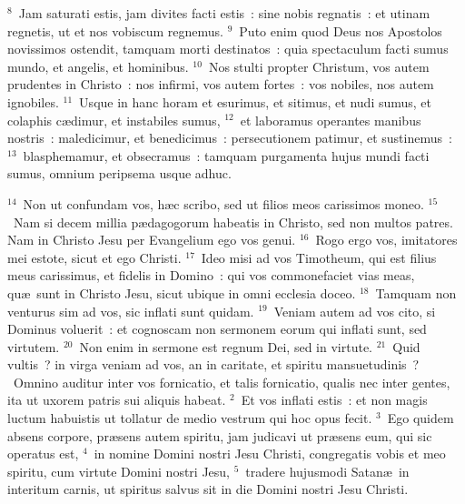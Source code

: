 ${}^{8}$~Jam saturati estis, jam divites facti estis~: sine nobis regnatis~: et utinam regnetis, ut et nos vobiscum regnemus.
${}^{9}$~Puto enim quod Deus nos Apostolos novissimos ostendit, tamquam morti destinatos~: quia spectaculum facti sumus mundo, et angelis, et hominibus.
${}^{10}$~Nos stulti propter Christum, vos autem prudentes in Christo~: nos infirmi, vos autem fortes~: vos nobiles, nos autem ignobiles.
${}^{11}$~Usque in hanc horam et esurimus, et sitimus, et nudi sumus, et colaphis c\ae dimur, et instabiles sumus,
${}^{12}$~et laboramus operantes manibus nostris~: maledicimur, et benedicimus~: persecutionem patimur, et sustinemus~:
${}^{13}$~blasphemamur, et obsecramus~: tamquam purgamenta hujus mundi facti sumus, omnium peripsema usque adhuc.


${}^{14}$~Non ut confundam vos, h\ae c scribo, sed ut filios meos carissimos moneo.
${}^{15}$~Nam si decem millia p\ae dagogorum habeatis in Christo, sed non multos patres. Nam in Christo Jesu per Evangelium ego vos genui.
${}^{16}$~Rogo ergo vos, imitatores mei estote, sicut et ego Christi.
${}^{17}$~Ideo misi ad vos Timotheum, qui est filius meus carissimus, et fidelis in Domino~: qui vos commonefaciet vias meas, qu\ae\ sunt in Christo Jesu, sicut ubique in omni ecclesia doceo.
${}^{18}$~Tamquam non venturus sim ad vos, sic inflati sunt quidam.
${}^{19}$~Veniam autem ad vos cito, si Dominus voluerit~: et cognoscam non sermonem eorum qui inflati sunt, sed virtutem.
${}^{20}$~Non enim in sermone est regnum Dei, sed in virtute.
${}^{21}$~Quid vultis~? in virga veniam ad vos, an in caritate, et spiritu mansuetudinis~?
~Omnino auditur inter vos fornicatio, et talis fornicatio, qualis nec inter gentes, ita ut uxorem patris sui aliquis habeat.
${}^{2}$~Et vos inflati estis~: et non magis luctum habuistis ut tollatur de medio vestrum qui hoc opus fecit.
${}^{3}$~Ego quidem absens corpore, pr\ae sens autem spiritu, jam judicavi ut pr\ae sens eum, qui sic operatus est,
${}^{4}$~in nomine Domini nostri Jesu Christi, congregatis vobis et meo spiritu, cum virtute Domini nostri Jesu,
${}^{5}$~tradere hujusmodi Satan\ae\ in interitum carnis, ut spiritus salvus sit in die Domini nostri Jesu Christi.


